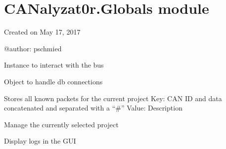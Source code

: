 \documentclass[letterpaper,10pt,english]{sphinxmanual}
\begin{document}
\section{CANalyzat0r.Globals module}
\label{\detokenize{src:canalyzat0r-globals-module}}\label{\detokenize{src:module-src.Globals}}
Created on May 17, 2017

@author: pschmied

\begin{fulllineitems}
\label{\detokenize{src:src.Globals.CANData}}
Instance to interact with the bus

\end{fulllineitems}


\begin{fulllineitems}
\label{\detokenize{src:src.Globals.db}}
Object to handle db connections

\end{fulllineitems}


\begin{fulllineitems}
\label{\detokenize{src:src.Globals.knownPackets}}
Stores all known packets for the current project
Key: CAN ID and data concatenated and separated with a “\#”
Value: Description

\end{fulllineitems}


\begin{fulllineitems}
\label{\detokenize{src:src.Globals.project}}
Manage the currently selected project

\end{fulllineitems}


\begin{fulllineitems}
\label{\detokenize{src:src.Globals.textBrowserLogs}}
Display logs in the GUI

\end{fulllineitems}
\end{document}
